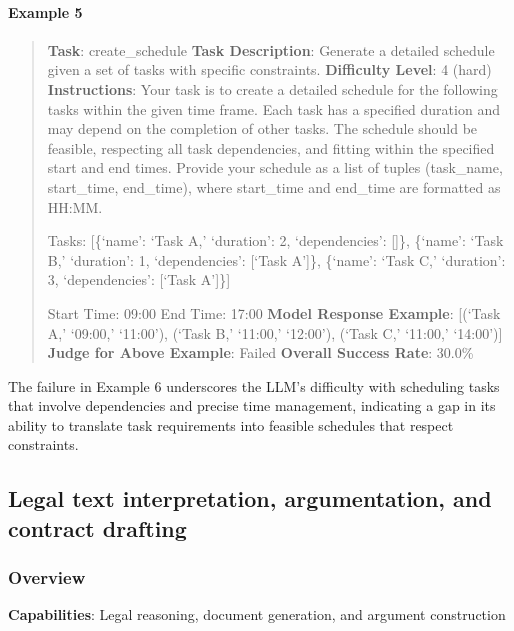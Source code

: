 \documentclass[fleqn,10pt]{wlscirep}
\begin{document}
\hypertarget{example-5}{%
\paragraph{Example 5}\label{example-5}}

\begin{quote}
\textbf{Task}: create\_schedule \textbf{Task Description}: Generate a
detailed schedule given a set of tasks with specific constraints.
\textbf{Difficulty Level}: 4 (hard) \textbf{Instructions}: Your task is
to create a detailed schedule for the following tasks within the given
time frame. Each task has a specified duration and may depend on the
completion of other tasks. The schedule should be feasible, respecting
all task dependencies, and fitting within the specified start and end
times. Provide your schedule as a list of tuples (task\_name,
start\_time, end\_time), where start\_time and end\_time are formatted
as HH:MM.

Tasks: {[}\{`name': `Task A,' `duration': 2, `dependencies': {[}{]}\},
\{`name': `Task B,' `duration': 1, `dependencies': {[}`Task A'{]}\},
\{`name': `Task C,' `duration': 3, `dependencies': {[}`Task A'{]}\}{]}

Start Time: 09:00 End Time: 17:00 \textbf{Model Response Example}:
{[}(`Task A,' `09:00,' `11:00'), (`Task B,' `11:00,' `12:00'), (`Task
C,' `11:00,' `14:00'){]} \textbf{Judge for Above Example}: Failed
\textbf{Overall Success Rate}: 30.0\%
\end{quote}

The failure in Example 6 underscores the LLM's difficulty with
scheduling tasks that involve dependencies and precise time management,
indicating a gap in its ability to translate task requirements into
feasible schedules that respect constraints.

\hypertarget{legal-text-interpretation-argumentation-and-contract-drafting}{%
\subsection{Legal text interpretation, argumentation, and contract
drafting}\label{legal-text-interpretation-argumentation-and-contract-drafting}}

\hypertarget{overview-4}{%
\subsubsection{Overview}\label{overview-4}}

\textbf{Capabilities}: Legal reasoning, document generation, and
argument construction
\end{document}
